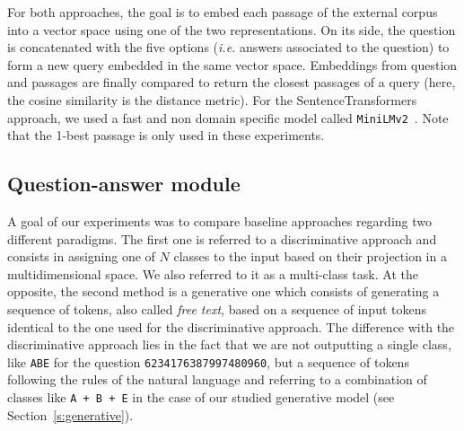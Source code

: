\documentclass[11pt]{article}
\begin{document}
For both approaches, the goal is to embed each passage of the external corpus into a vector space using one of the two representations. On its side, the question is concatenated with the five options ({\it i.e.} answers associated to the question) to form a new query embedded in the same vector space. Embeddings from question and passages are finally compared to return the closest passages of a query (here, the cosine similarity is the distance metric). For the SentenceTransformers approach, we used a fast and non domain specific model called \texttt{MiniLMv2}~\cite{https://doi.org/10.48550/arxiv.2012.15828}. 
Note that the 1-best passage is only used in these experiments.

















































\subsection{Question-answer module}
\label{s:qa}

A goal of our experiments was to compare baseline approaches regarding two different paradigms. The first one is referred to a discriminative approach and consists in assigning one of $N$ classes to the input based on their projection in a multidimensional space. We also referred to it as a multi-class task. At the opposite, the second method is  a generative one which consists of generating a sequence of tokens, also called {\it free text}, based on a sequence of input tokens identical to the one used for the discriminative approach. The difference with the discriminative approach lies in the fact that we are not outputting a single class, like \texttt{ABE} for the question \texttt{6234176387997480960}, but a sequence of tokens following the rules of the natural language and referring to a combination of classes like \texttt{A + B + E} in the case of our studied generative model (see Section~\ref{s:generative}).
\end{document}

